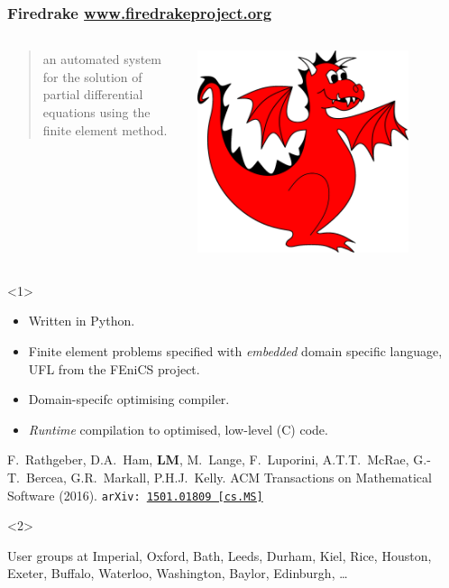 \documentclass[presentation,aspectratio=43, 10pt]{beamer}
\newcommand{\arxivlink}[2]{{\texttt{arXiv:\,\href{https://arxiv.org/abs/#1}{#1\,[#2]}}}}
\begin{document}
\begin{frame}
  \frametitle{Firedrake \url{www.firedrakeproject.org}}
  \begin{columns}
    \begin{column}{0.8\textwidth}
      \begin{quote}
        {\normalfont [\ldots]} an automated system for the solution of
        partial differential equations using the finite element
        method.
      \end{quote}
    \end{column}
    \begin{column}{0.2\textwidth}
      \includegraphics[width=0.8\textwidth]{firedrake}
    \end{column}
  \end{columns}
  \begin{overlayarea}{\textwidth}{0.6\textheight}
    \begin{onlyenv}<1>
      \begin{itemize}
      \item Written in Python.
      \item Finite element problems specified with \emph{embedded}
        domain specific language, UFL \parencite{Alnaes:2014} from the
        FEniCS project.
      \item Domain-specifc optimising compiler.
      \item \emph{Runtime} compilation to optimised, low-level (C)
        code.
      \end{itemize}
      \begin{flushright}
        {\scriptsize F.~Rathgeber, D.A.~Ham, \textbf{LM}, M.~Lange,
        F.~Luporini, A.T.T.~McRae, G.-T.~Bercea, G.R.~Markall,
        P.H.J.~Kelly. ACM Transactions on Mathematical Software
        (2016). \arxivlink{1501.01809}{cs.MS}\nocite{Rathgeber:2016}}
      \end{flushright}
  \end{onlyenv}
  \begin{onlyenv}<2>
    \begin{block}{User groups at}
      Imperial, Oxford, Bath, Leeds, Durham, Kiel, Rice, Houston,
      Exeter, Buffalo, Waterloo, Washington, Baylor, Edinburgh, \dots


\end{block}
\end{onlyenv}
\end{overlayarea}
\end{frame}
\end{document}
